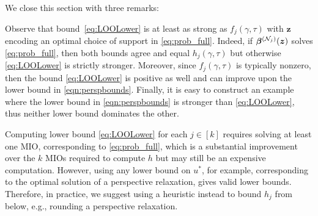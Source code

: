 \documentclass[mnsc,nonblindrev]{informs3} %
\newcommand{\ag}[1]{{\color{black}#1}}
\begin{document}
\endproof
We close this section with three remarks:
\begin{remark}
Observe that bound~\eqref{eq:LOOLower} is at least as strong as $f_j(\gamma, \tau)$ with $\bm{z}$ encoding an optimal choice of support in \eqref{eq:prob_full}. Indeed, if $\bm{\beta}^{(\ag{\mathcal{N}_j})}(\bm{z})$ solves \eqref{eq:prob_full}, then both bounds agree and equal $h_j(\gamma, \tau)$ but otherwise \eqref{eq:LOOLower} is strictly stronger. Moreover, since $f_j(\gamma, \tau)$ is typically nonzero, then the bound \eqref{eq:LOOLower} is positive as well and can improve upon the lower bound in \eqref{eqn:perspbounds}. Finally, it is easy to construct an example where the lower bound in \eqref{eqn:perspbounds} is stronger than \eqref{eq:LOOLower}, thus neither lower bound dominates the other.
\end{remark}
\begin{remark}
	Computing lower bound \eqref{eq:LOOLower} for each \ag{$j\in [k]$} requires solving at least one MIO, corresponding to \eqref{eq:prob_full}, which is a substantial improvement over the \ag{$k$} MIOs required to compute $h$ but may still be an expensive computation. However, using any lower bound on $u^*$, for example, corresponding to the optimal solution of a perspective relaxation, gives valid lower bounds. Therefore, in practice, we suggest using a heuristic instead to bound $h_j$ from below, e.g., rounding a perspective relaxation.
\end{remark}

\end{document}
